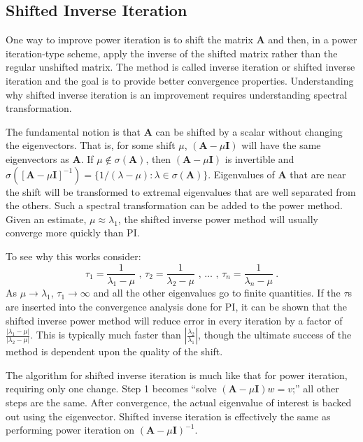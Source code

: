 \documentclass[12pt]{article}
\newcommand{\ve}[1]{\ensuremath{\mathbf{#1}}}
\begin{document}
\subsection*{Shifted Inverse Iteration}
One way to improve power iteration is to shift the matrix $\ve{A}$ and then, in a power iteration-type scheme, apply the inverse of the shifted matrix rather than the regular unshifted matrix. The method is called inverse iteration or shifted inverse iteration and the goal is to provide better convergence properties. Understanding why shifted inverse iteration is an improvement requires understanding spectral transformation. 

The fundamental notion is that $\ve{A}$ can be shifted by a scalar without changing the eigenvectors. That is, for some shift $\mu$, $(\ve{A} - \mu \ve{I})$ will have the same eigenvectors as $\ve{A}$. %
If $\mu \notin \sigma(\ve{A})$, then $(\ve{A} - \mu \ve{I})$ is invertible and $\sigma([\ve{A} - \mu \ve{I}]^{-1}) = \{1/(\lambda - \mu):\lambda \in \sigma(\ve{A})\}$. Eigenvalues of $\ve{A}$ that are near the shift will be transformed to extremal eigenvalues that are well separated from the others. Such a spectral transformation can be added to the power method. Given an estimate, $\mu \approx \lambda_1$, the shifted inverse power method will usually converge more quickly than PI.

To see why this works consider: 
%
\begin{equation}
    \tau_1 = \frac{1}{\lambda_1 - \mu}\text{ , }\tau_2 = \frac{1}{\lambda_2 - \mu}\text{ , }\dots\text{ , }\tau_n = \frac{1}{\lambda_n - \mu} \:.
\end{equation}
%
As $\mu \to \lambda_1$, $\tau_1 \to \infty$ and all the other eigenvalues go to finite quantities. If the $\tau$s are inserted into the convergence analysis done for PI, it can be shown that the shifted inverse power method will reduce error in every iteration by a factor of $\frac{|\lambda_{1} - \mu|}{|\lambda_{2} - \mu|}$. This is typically much faster than $|\frac{\lambda_{2}}{\lambda_{1}}|$, though the ultimate success of the method is dependent upon the quality of the shift.%

The algorithm for shifted inverse iteration is much like that for power iteration, requiring only one change. Step 1 becomes ``solve $(\ve{A}-\mu \ve{I})w = v$;'' all other steps are the same. After convergence, the actual eigenvalue of interest is backed out using the eigenvector. %
Shifted inverse iteration is effectively the same as performing power iteration on $(\ve{A}-\mu \ve{I})^{-1}$. 
\end{document}
